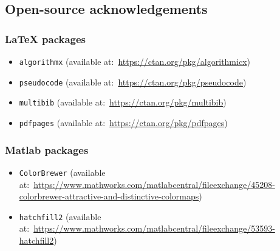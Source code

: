 
\cleardoublepage
{}
{}

\small

%


\newpage
\subsection*{Open-source acknowledgements}
\subsubsection*{LaTeX packages}
\begin{itemize}
	\item \texttt{algorithmx} (available at:~\url{https://ctan.org/pkg/algorithmicx})	%
	\item \texttt{pseudocode} (available at:~\url{https://ctan.org/pkg/pseudocode})
	\item \texttt{multibib} (available at:~\url{https://ctan.org/pkg/multibib})		%
	\item \texttt{pdfpages} (available at:~\url{https://ctan.org/pkg/pdfpages})	%
\end{itemize}

\subsubsection*{Matlab packages}
\begin{itemize}
	\item \texttt{ColorBrewer} 	(available at:~\url{https://www.mathworks.com/matlabcentral/fileexchange/45208-colorbrewer-attractive-and-distinctive-colormaps}) %
	\item \texttt{hatchfill2} (available at:~\url{https://www.mathworks.com/matlabcentral/fileexchange/53593-hatchfill2}) %
\end{itemize}